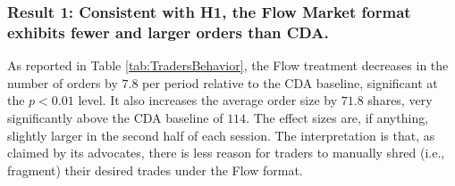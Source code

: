 \documentclass[12pt]{article}
\begin{document}


\subsubsection*{Result 1: 
Consistent with H1, the Flow Market format exhibits fewer and larger orders than CDA.}

As reported in Table \ref{tab:TradersBehavior}, the Flow treatment decreases in the number of orders by $7.8$ per period relative to the CDA baseline, significant at the $p<0.01$ level. 
It also increases the average order size by $71.8$ shares, very significantly above the CDA baseline of $114$. 
The effect sizes are, if anything, slightly larger in the second half of each session. 
The interpretation is that, as claimed by its advocates, there is less reason for traders to manually shred (i.e., fragment) their desired trades under the Flow format.
\end{document}

